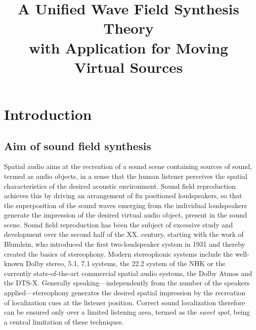 \documentclass[10pt,twoside]{article}
\author{\theauthor}
\title{A Unified Wave Field Synthesis Theory\\[.5ex]with Application for Moving Virtual Sources}
\theoremstyle{thesisgroupstyle}
\begin{document}
\newcommand{\schoolname}{Budapest University of Technology and Economics}
\newcommand{\facultyname}{Faculty of Electrical Engineering and Informatics}
\newcommand{\doctoralname}{Doctoral School of Electrical Engineering}
\newcommand{\bookname}{Ph.D.\ Thesis Booklet}
\newcommand{\authorname}{Author}
\newcommand{\supervisorname}{Supervisor}
\newcommand{\supervisor}{Péter Fiala, PhD.}
\newcommand{\creationdate}{Budapest, 2018.}
\def \deptlogo {logos/hit_logo_en.png}

\nonfrenchspacing


\thispagestyle{empty}
\cleardoublepage
\setcounter{page}{1}

\section{Introduction}

\subsection{Aim of sound field synthesis}
%
Spatial audio aims at the recreation of a sound scene containing sources of sound, termed as audio objects, in a sense that the human listener perceives the spatial characteristics of the desired acoustic environment.
Sound field reproduction achieves this by driving an arrangement of fix positioned loudspeakers, so that the superposition of the sound waves emerging from the individual loudspeakers generate the impression of the desired virtual audio object, present in the sound scene.
Sound field reproduction has been the subject of excessive study and development over the second half of the XX. century, starting with the work of Blumlein, who introduced the first two-loudspeaker system in 1931 and thereby created the basics of stereophony.
Modern stereophonic systems include the well-known Dolby stereo, 5.1, 7.1 systems, the 22.2 system of the NHK or the currently state-of-the-art commercial spatial audio systems, the Dolby Atmos and the DTS-X.
Generally speaking---independently from the number of the speakers applied---stereophony generates the desired spatial impression by the recreation of localization cues at the listener position.
Correct sound localization therefore can be ensured only over a limited listening area, termed as the \emph{sweet spot}, being a central limitation of these techniques.
\end{document}
